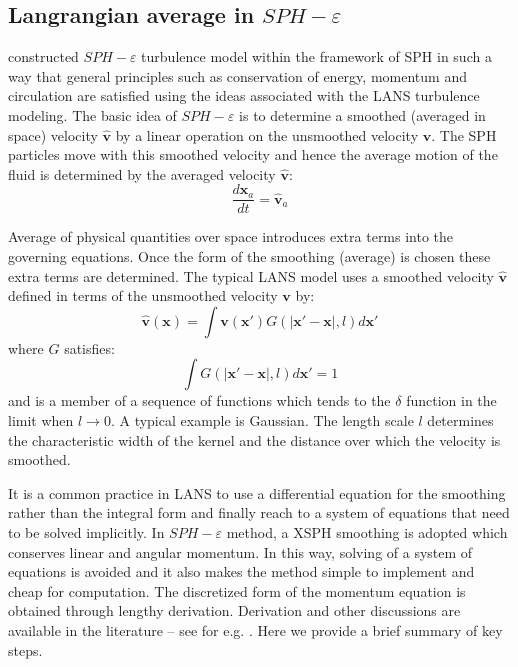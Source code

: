 \subsection{Langrangian average in $SPH-\varepsilon$}
\citet{monaghan2011turbulence} constructed $SPH-\varepsilon$ turbulence model within the framework of SPH in such a way that general principles such as conservation of energy, momentum and circulation are satisfied using the ideas associated with the LANS turbulence modeling. The basic idea of $SPH-\varepsilon$ is to determine a smoothed (averaged in space) velocity $\widehat{\textbf{v}}$ by a linear operation on the unsmoothed velocity $\textbf{v}$. The SPH particles move with this smoothed velocity and hence the average motion of the fluid is determined by the averaged velocity $\widehat{\textbf{v}}$:
\begin{equation}
\dfrac{d \textbf{x}_a}{dt} = \widehat{\textbf{v}}_a \label{eq:gov-update-pos-turbulence}
\end{equation}

Average of physical quantities over space introduces extra terms into the governing equations. Once the form of the smoothing (average) is chosen these extra terms are determined.
The typical LANS model uses a smoothed velocity $\widehat{\textbf{v}}$ 
defined in terms of the unsmoothed velocity $\textbf{v}$ by:
\begin{equation}
\widehat{\textbf{v}}\left(\textbf{x}\right)=\int \textbf{v}\left(\textbf{x} \prime\right)G\left(\vert \textbf{x} \prime - \textbf{x} \vert, l\right) d\textbf{x} \prime
\end{equation}
where $G$ satisfies:
\begin{equation}
\int G\left(\vert \textbf{x} \prime - \textbf{x} \vert, l\right) d\textbf{x} \prime =1
\end{equation}
and is a member of a sequence of functions which tends to the $\delta$ function in the limit when $ l\rightarrow 0$. A typical example is Gaussian.
The length scale $l$ determines the characteristic width of the kernel and the distance over which the velocity is smoothed.

It is a common practice in LANS to use a differential equation for the smoothing rather than the integral form and finally reach to a system of equations that need to be solved implicitly. In $SPH-\varepsilon$ method, a XSPH \citep{monaghan1989problem} smoothing is adopted which conserves linear and angular momentum. In this way, solving of a system of equations is avoided and it also makes the method simple to implement and cheap for computation. 
The discretized form of the momentum equation is obtained through lengthy derivation. Derivation and other discussions are available in the literature -- see for e.g. \citep{monaghan2011turbulence}. Here we provide a brief summary of key steps.

